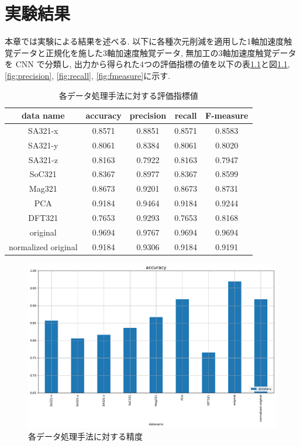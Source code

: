 
\chapter{実験結果}
\label{chap:result}
本章では実験による結果を述べる. 
以下に各種次元削減を適用した1軸加速度触覚データと正規化を施した3軸加速度触覚データ, 無加工の3軸加速度触覚データを CNN で分類し, 出力から得られた4つの評価指標の値を以下の表\ref{tab:result}と図\ref{fig:accuracy}, \ref{fig:precision}, \ref{fig:recall}, \ref{fig:fmeasure}に示す. 

\begin{table}[htp]
\begin{center}
\caption{各データ処理手法に対する評価指標値}
\begin{tabular}{|c||c|c|c|c|}
\hline
data name           & accuracy & precision & recall & F-measure \\ \hline \hline
SA321-x             & 0.8571   & 0.8851    & 0.8571 & 0.8583    \\ \hline
SA321-y             & 0.8061   & 0.8384    & 0.8061 & 0.8020    \\ \hline
SA321-z             & 0.8163   & 0.7922    & 0.8163 & 0.7947    \\ \hline
SoC321              & 0.8367   & 0.8977    & 0.8367 & 0.8599    \\ \hline
Mag321              & 0.8673   & 0.9201    & 0.8673 & 0.8731    \\ \hline
PCA                 & 0.9184   & 0.9464    & 0.9184 & 0.9244    \\ \hline
DFT321              & 0.7653   & 0.9293    & 0.7653 & 0.8168    \\ \hline
original            & 0.9694   & 0.9767    & 0.9694 & 0.9694    \\ \hline
normalized original & 0.9184   & 0.9306    & 0.9184 & 0.9191    \\ \hline
\end{tabular}
\label{tab:result}
\end{center}
\end{table}

\begin{figure}[H]
    \begin{center}
    \includegraphics[width=12cm]{eps/accuracy.pdf}
    \caption{各データ処理手法に対する精度}
    \label{fig:accuracy}
   \end{center}
   \end{figure}
   
